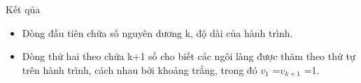Kết qủa
\begin{itemize}
	\item     Dòng đầu tiên chứa số nguyên dương k, độ dài của hành trình.   
	\item     Dòng thứ hai theo chứa k+1 số cho biết các ngôi làng được thăm theo thứ tự trên hành trình, cách nhau bởi khoảng trắng, trong đó $v_{1}$    =$v_{k+1}$    =1.   
\end{itemize}